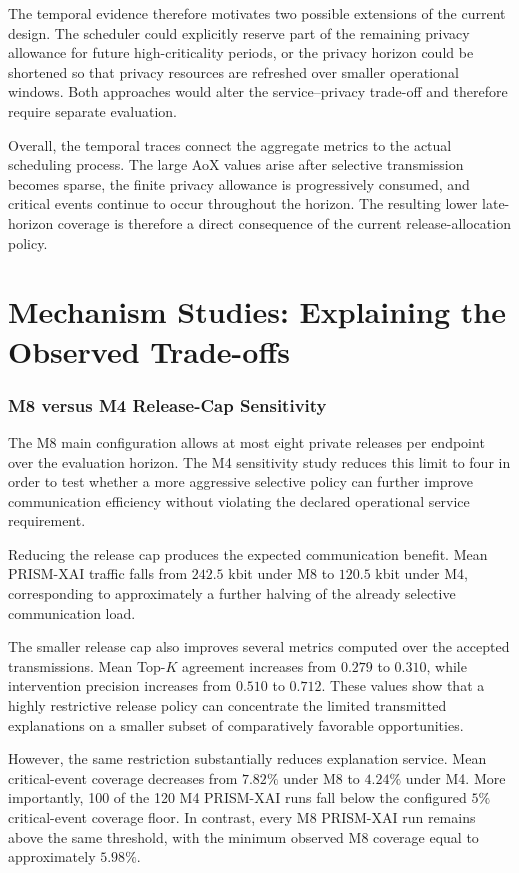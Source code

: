 \documentclass[11pt]{article}
\begin{document}
The temporal evidence therefore motivates two possible extensions of the current design. The scheduler could explicitly reserve part of the remaining privacy allowance for future high-criticality periods, or the privacy horizon could be shortened so that privacy resources are refreshed over smaller operational windows. Both approaches would alter the service--privacy trade-off and therefore require separate evaluation.

Overall, the temporal traces connect the aggregate metrics to the actual scheduling process. The large AoX values arise after selective transmission becomes sparse, the finite privacy allowance is progressively consumed, and critical events continue to occur throughout the horizon. The resulting lower late-horizon coverage is therefore a direct consequence of the current release-allocation policy.

\part{Mechanism Studies: Explaining the Observed Trade-offs}

\section{M8 versus M4 Release-Cap Sensitivity}

The M8 main configuration allows at most eight private releases per endpoint over the evaluation horizon. The M4 sensitivity study reduces this limit to four in order to test whether a more aggressive selective policy can further improve communication efficiency without violating the declared operational service requirement.

Reducing the release cap produces the expected communication benefit. Mean PRISM-XAI traffic falls from \(242.5\) kbit under M8 to \(120.5\) kbit under M4, corresponding to approximately a further halving of the already selective communication load.

The smaller release cap also improves several metrics computed over the accepted transmissions. Mean Top-$K$ agreement increases from \(0.279\) to \(0.310\), while intervention precision increases from \(0.510\) to \(0.712\). These values show that a highly restrictive release policy can concentrate the limited transmitted explanations on a smaller subset of comparatively favorable opportunities.

However, the same restriction substantially reduces explanation service. Mean critical-event coverage decreases from \(7.82\%\) under M8 to \(4.24\%\) under M4. More importantly, 100 of the 120 M4 PRISM-XAI runs fall below the configured \(5\%\) critical-event coverage floor. In contrast, every M8 PRISM-XAI run remains above the same threshold, with the minimum observed M8 coverage equal to approximately \(5.98\%\).
\end{document}
